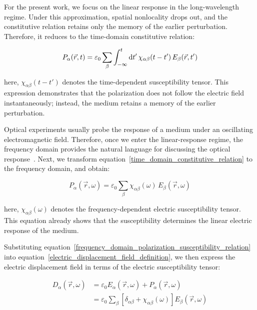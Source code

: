 For the present work, we focus on the linear response in the long-wavelength regime.
Under this approximation, spatial nonlocality drops out, and the constitutive relation retains only the memory of the earlier perturbation.
Therefore, it reduces to the time-domain constitutive relation:

\begin{equation}
    P_\alpha(\vec{r},t)=
    \varepsilon_0\sum_\beta\int_{-\infty}^{t}\mathrm{d}{t'}\,\chi_{\alpha\beta}(t-t')\,E_\beta(\vec{r},t')
\label{time_domain_constitutive_relation}
\end{equation}

here, $\chi_{\alpha\beta}(t-t')$ denotes the time-dependent susceptibility tensor.
This expression demonstrates that the polarization does not follow the electric field instantaneously;
instead, the medium retains a memory of the earlier perturbation.

Optical experiments usually probe the response of a medium under an oscillating electromagnetic field.
Therefore, once we enter the linear-response regime, the frequency domain provides the natural language for discussing the optical response~\cite{han2023temperature}.
Next, we transform equation~\eqref{time_domain_constitutive_relation} to the frequency domain, and obtain:

\begin{equation}
    P_\alpha(\vec{r},\omega)=\varepsilon_0\sum_\beta\chi_{\alpha\beta}(\omega)\,E_\beta(\vec{r},\omega)
\label{frequency_domain_polarization_susceptibility_relation}
\end{equation}

here, $\chi_{\alpha\beta}(\omega)$ denotes the frequency-dependent electric susceptibility tensor.
This equation already shows that the susceptibility determines the linear electric response of the medium.

Substituting equation~\eqref{frequency_domain_polarization_susceptibility_relation} into equation~\eqref{electric_displacement_field_definition},
we then express the electric displacement field in terms of the electric susceptibility tensor:

\begin{equation}
\begin{aligned}
    D_\alpha(\vec{r},\omega)
    &=\varepsilon_0 E_\alpha(\vec{r},\omega)+P_\alpha(\vec{r},\omega) \\
    &=\varepsilon_0\sum_\beta\left[\delta_{\alpha\beta}+\chi_{\alpha\beta}(\omega)\right]E_\beta(\vec{r},\omega)
\end{aligned}
\label{electric_displacement_from_susceptibility}
\end{equation}


